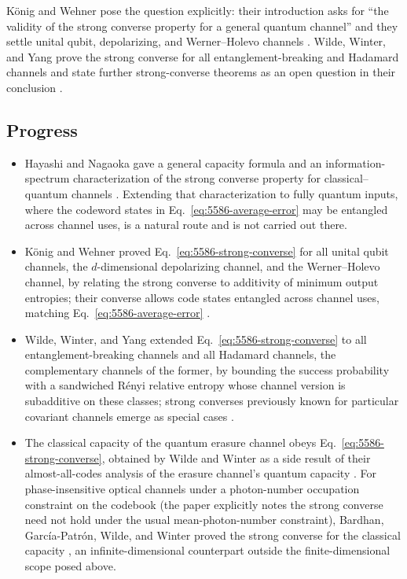K\"onig and Wehner pose the question explicitly: their introduction asks
for ``the validity of the strong converse property for a general quantum
channel'' and they settle unital qubit, depolarizing, and Werner--Holevo
channels .  Wilde, Winter, and Yang
prove the strong converse for all entanglement-breaking and Hadamard channels
and state further strong-converse theorems as an open question in their
conclusion .

\subsection*{Progress}

\begin{itemize}
  \item Hayashi and Nagaoka gave a general capacity formula and an
  information-spectrum characterization of the strong converse property for
  classical--quantum channels .
  Extending that characterization to fully quantum inputs, where the codeword
  states in Eq.~\eqref{eq:5586-average-error} may be entangled across channel
  uses, is a natural route and is not carried out there.

  \item K\"onig and Wehner proved Eq.~\eqref{eq:5586-strong-converse} for all
  unital qubit channels, the $d$-dimensional depolarizing channel, and the
  Werner--Holevo channel, by relating the strong converse to additivity of
  minimum output entropies; their converse allows code states entangled
  across channel uses, matching Eq.~\eqref{eq:5586-average-error}
  .

  \item Wilde, Winter, and Yang extended Eq.~\eqref{eq:5586-strong-converse} to
  all entanglement-breaking channels and all Hadamard channels, the
  complementary channels of the former, by bounding the success probability
  with a sandwiched R\'enyi relative entropy whose channel version is
  subadditive on these classes; strong converses previously known for
  particular covariant channels emerge as special cases
  .

  \item The classical capacity of the quantum erasure channel obeys
  Eq.~\eqref{eq:5586-strong-converse}, obtained by Wilde and Winter as a side
  result of their almost-all-codes analysis of the erasure channel's quantum
  capacity .  For
  phase-insensitive optical channels under a photon-number occupation
  constraint on the codebook (the paper explicitly notes the strong converse
  need not hold under the usual mean-photon-number constraint), Bardhan,
  Garc\'ia-Patr\'on, Wilde, and Winter proved the strong converse for the
  classical capacity , an
  infinite-dimensional counterpart outside the finite-dimensional scope posed
  above.


\end{itemize}
